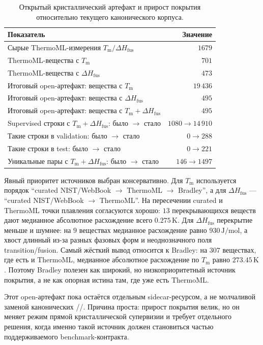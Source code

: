 \documentclass[11pt]{article}
\DeclareRobustCommand{\code}[1]{\texttt{\detokenize{#1}}}
\newcommand{\Tm}{T_{\mathrm m}}
\newcommand{\dHfus}{\Delta H_{\mathrm{fus}}}
\theoremstyle{definition}
\begin{document}
\begin{table}[!htbp]
\centering
\caption{Открытый кристаллический артефакт и прирост покрытия относительно текущего канонического корпуса.}
\label{tab:app-open-crystal}
\small
\begin{tabular}{lr}
\toprule
Показатель & Значение \\
\midrule
Сырые ThermoML-измерения $\Tm/\dHfus$ & $1679$ \\
ThermoML-вещества с $\Tm$ & $701$ \\
ThermoML-вещества с $\dHfus$ & $473$ \\
Итоговый open-артефакт: вещества с $\Tm$ & $19\,436$ \\
Итоговый open-артефакт: вещества с $\dHfus$ & $495$ \\
Итоговый open-артефакт: вещества с $\Tm+\dHfus$ & $495$ \\
Supervised строки с $\Tm+\dHfus$: было $\to$ стало & $1080 \to 14\,910$ \\
Такие строки в validation: было $\to$ стало & $0 \to 288$ \\
Такие строки в test: было $\to$ стало & $0 \to 221$ \\
Уникальные пары с $\Tm+\dHfus$: было $\to$ стало & $146 \to 1497$ \\
\bottomrule
\end{tabular}
\end{table}

Явный приоритет источников выбран консервативно. Для $\Tm$ используется порядок ``curated NIST/WebBook $\rightarrow$ ThermoML $\rightarrow$ Bradley'', а для $\dHfus$ --- ``curated NIST/WebBook $\rightarrow$ ThermoML''. На пересечении curated и ThermoML точки плавления согласуются хорошо: $13$ перекрывающихся веществ дают медианное абсолютное расхождение всего $0.275\,\mathrm K$. Для $\dHfus$ перекрытие меньше и шумнее: на $9$ веществах медианное расхождение равно $930\,\mathrm{J/mol}$, а хвост длинный из-за разных фазовых форм и неоднозначного поля transition/fusion. Самый жёсткий вывод относится к Bradley: на $307$ веществах, где есть и ThermoML, медианное абсолютное расхождение по $\Tm$ равно $273.45\,\mathrm K$. Поэтому Bradley полезен как широкий, но низкоприоритетный источник покрытия, а не как опорная истина там, где уже есть ThermoML.

Этот open-артефакт пока остаётся отдельным sidecar-ресурсом, а не молчаливой заменой канонических \code{train.csv}/\code{val.csv}/\code{test.csv}. Причина проста: прирост покрытия велик, но он меняет режим прямой кристаллической супервизии и требует отдельного решения, когда именно такой источник должен становиться частью поддерживаемого benchmark-контракта.
\end{document}
